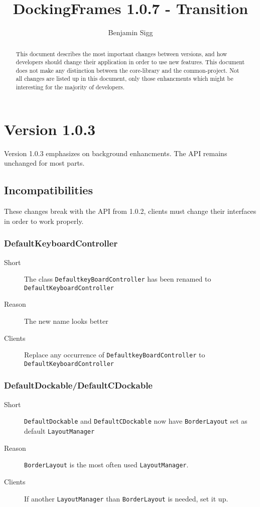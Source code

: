 \documentclass[a4paper,10pt]{article}
\title{DockingFrames 1.0.7 - Transition}
\author{Benjamin Sigg}
\newcommand{\src}[1]{\lstinline[basicstyle=\normalsize\ttfamily,keywordstyle=\normalsize\ttfamily,identifierstyle=\normalsize\ttfamily]|#1|}
\newcommand{\short}{\item[Short]}
\newcommand{\why}{\item[Reason]}
\newcommand{\clients}{\item[Clients]}
\begin{document}
\maketitle
\tableofcontents
\newpage


\begin{abstract}
This document describes the most important changes between versions, and how developers should change their application in order to use new features. This document does not make any distinction between the core-library and the common-project. Not all changes are listed up in this document, only those enhancments which might be interesting for the majority of developers.
\end{abstract}

\section{Version 1.0.3}
Version 1.0.3 emphasizes on background enhancments. The API remains unchanged for most parts.
\subsection{Incompatibilities}
These changes break with the API from 1.0.2, clients must change their interfaces in order to work properly.

\subsubsection{DefaultKeyboardController}
\begin{description}
\short The class \src{DefaultkeyBoardController} has been renamed to \\\src{DefaultKeyboardController} 
\why The new name looks better
\clients Replace any occurrence of \src{DefaultkeyBoardController} to \\\src{DefaultKeyboardController}
\end{description}

\subsubsection{DefaultDockable/DefaultCDockable}
\begin{description}
 \short \src{DefaultDockable} and \src{DefaultCDockable} now have \src{BorderLayout} set as default \src{LayoutManager}
 \why \src{BorderLayout} is the most often used \src{LayoutManager}.
 \clients If another \src{LayoutManager} than \src{BorderLayout} is needed, set it up.
\end{description}
\end{document}

